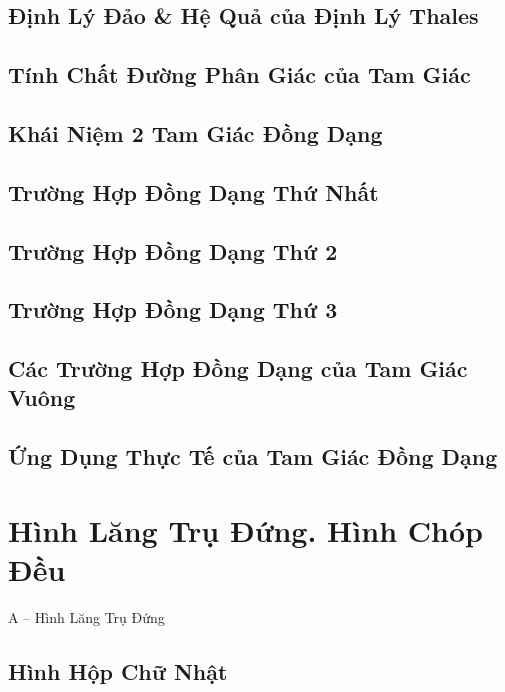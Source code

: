 \documentclass[oneside]{book}
\numberwithin{equation}{section}
\begin{document}
\section{Định Lý Đảo \& Hệ Quả của Định Lý Thales}

\section{Tính Chất Đường Phân Giác của Tam Giác}

\section{Khái Niệm 2 Tam Giác Đồng Dạng}

\section{Trường Hợp Đồng Dạng Thứ Nhất}

\section{Trường Hợp Đồng Dạng Thứ 2}

\section{Trường Hợp Đồng Dạng Thứ 3}

\section{Các Trường Hợp Đồng Dạng của Tam Giác Vuông}

\section{Ứng Dụng Thực Tế của Tam Giác Đồng Dạng}


\chapter{Hình Lăng Trụ Đứng. Hình Chóp Đều}

\begin{center}
	\Large A -- Hình Lăng Trụ Đứng
\end{center}

\section{Hình Hộp Chữ Nhật}
\end{document}
